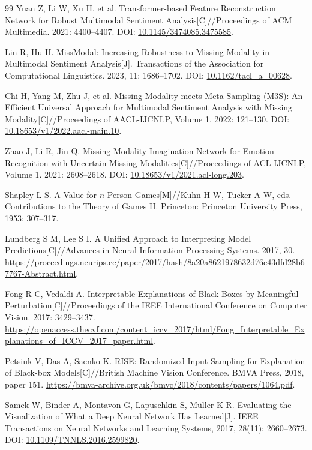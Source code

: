 {\begin{thebibliography}{99}
 Yuan Z, Li W, Xu H, et al. Transformer-based Feature Reconstruction Network for Robust Multimodal Sentiment Analysis[C]//Proceedings of ACM Multimedia. 2021: 4400--4407. DOI: \url{10.1145/3474085.3475585}.

 Lin R, Hu H. MissModal: Increasing Robustness to Missing Modality in Multimodal Sentiment Analysis[J]. Transactions of the Association for Computational Linguistics. 2023, 11: 1686--1702. DOI: \url{10.1162/tacl_a_00628}.

 Chi H, Yang M, Zhu J, et al. Missing Modality meets Meta Sampling (M3S): An Efficient Universal Approach for Multimodal Sentiment Analysis with Missing Modality[C]//Proceedings of AACL-IJCNLP, Volume 1. 2022: 121--130. DOI: \url{10.18653/v1/2022.aacl-main.10}.

 Zhao J, Li R, Jin Q. Missing Modality Imagination Network for Emotion Recognition with Uncertain Missing Modalities[C]//Proceedings of ACL-IJCNLP, Volume 1. 2021: 2608--2618. DOI: \url{10.18653/v1/2021.acl-long.203}.

 Shapley L S. A Value for $n$-Person Games[M]//Kuhn H W, Tucker A W, eds. Contributions to the Theory of Games II. Princeton: Princeton University Press, 1953: 307--317.

 Lundberg S M, Lee S I. A Unified Approach to Interpreting Model Predictions[C]//Advances in Neural Information Processing Systems. 2017, 30. \url{https://proceedings.neurips.cc/paper/2017/hash/8a20a8621978632d76c43dfd28b67767-Abstract.html}.

 Fong R C, Vedaldi A. Interpretable Explanations of Black Boxes by Meaningful Perturbation[C]//Proceedings of the IEEE International Conference on Computer Vision. 2017: 3429--3437. \url{https://openaccess.thecvf.com/content_iccv_2017/html/Fong_Interpretable_Explanations_of_ICCV_2017_paper.html}.

 Petsiuk V, Das A, Saenko K. RISE: Randomized Input Sampling for Explanation of Black-box Models[C]//British Machine Vision Conference. BMVA Press, 2018, paper 151. \url{https://bmva-archive.org.uk/bmvc/2018/contents/papers/1064.pdf}.

 Samek W, Binder A, Montavon G, Lapuschkin S, M\"uller K R. Evaluating the Visualization of What a Deep Neural Network Has Learned[J]. IEEE Transactions on Neural Networks and Learning Systems, 2017, 28(11): 2660--2673. DOI: \url{10.1109/TNNLS.2016.2599820}.


\end{thebibliography}}
